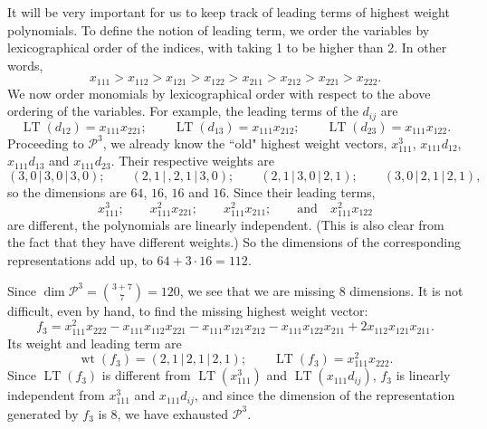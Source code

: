 \documentclass[reqno,11pt]{amsart}
\theoremstyle{remark}
\theoremstyle{definition}
\numberwithin{equation}{section}
\newcommand{\bbar}{\,\big|\,}
\newcommand{\Pol}{\mathcal{P}}
\newcommand{\wt}{\operatorname{wt}}
\newcommand{\LT}{\operatorname{LT}}
\begin{document}
It will be very important for us to keep track of  leading terms of highest weight polynomials. To define the notion of leading term, we order the variables by lexicographical order of the indices, with taking 1 to be higher than 2. In other words,
\[
x_{111}>x_{112}>x_{121}>x_{122}>x_{211}>x_{212}>x_{221}>x_{222}.
\]
We now order monomials by lexicographical order with respect to the above ordering of the variables. For example, the leading terms of the $d_{ij}$ are
\[
\LT(d_{12})=x_{111}x_{221};\qquad \LT(d_{13})=x_{111}x_{212};\qquad \LT(d_{23})=x_{111}x_{122}.
\]
Proceeding to $\Pol^3$, we already know the ``old" highest weight vectors, $x_{111}^3$, $x_{111}d_{12}$, $x_{111}d_{13}$ and $x_{111}d_{23}$. Their respective
weights are
\[
(3,0\bbar 3,0\bbar 3,0);\qquad (2,1\bbar, 2,1\bbar 3,0);\qquad (2,1\bbar 3,0\bbar 2,1);\qquad (3,0\bbar 2,1\bbar 2,1),
\]
so the dimensions are $64$, $16$, $16$ and $16$. 
Since their leading terms,
\[
x_{111}^3;\qquad x_{111}^2x_{221};\qquad x_{111}^2x_{211};\qquad \text{and}\quad x_{111}^2x_{122}
\]
are different, the polynomials are linearly independent. (This is also clear from the fact that they have different weights.) So the dimensions of the corresponding representations add up, to $64+3\cdot 16=112$.

Since $\dim\Pol^3=\binom{3+7}{7}=120$, we see that we are missing 8 dimensions. It is not difficult, even by hand, to find the missing highest weight vector:
\[
f_3= x_{111}^2x_{222}-x_{111}x_{112}x_{221}-x_{111}x_{121}x_{212}-x_{111}x_{122}x_{211}+2x_{112}x_{121}x_{211}.
\]
Its weight and leading term are
\[
\wt(f_3)=(2,1\bbar 2,1\bbar 2,1);\qquad \LT(f_3)=x_{111}^2x_{222}.
\]
Since $\LT(f_3)$ is different from $\LT(x_{111}^3)$ and $\LT(x_{111}d_{ij})$, $f_3$ is linearly independent from $x_{111}^3$ and $x_{111}d_{ij}$, and since the dimension of the representation generated by $f_3$ is 8, we have exhausted $\Pol^3$. 
\end{document}
